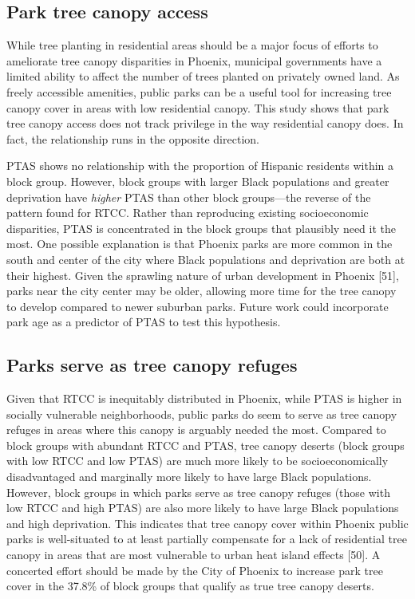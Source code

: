\documentclass[
  sn-basic,
]{sn-jnl}
\begin{document}
\subsection{Park tree canopy access}\label{sec-disc-ptas}

While tree planting in residential areas should be a major focus of
efforts to ameliorate tree canopy disparities in Phoenix, municipal
governments have a limited ability to affect the number of trees planted
on privately owned land. As freely accessible amenities, public parks
can be a useful tool for increasing tree canopy cover in areas with low
residential canopy. This study shows that park tree canopy access does
not track privilege in the way residential canopy does. In fact, the
relationship runs in the opposite direction.

PTAS shows no relationship with the proportion of Hispanic residents
within a block group. However, block groups with larger Black
populations and greater deprivation have \emph{higher} PTAS than other
block groups---the reverse of the pattern found for RTCC. Rather than
reproducing existing socioeconomic disparities, PTAS is concentrated in
the block groups that plausibly need it the most. One possible
explanation is that Phoenix parks are more common in the south and
center of the city where Black populations and deprivation are both at
their highest. Given the sprawling nature of urban development in
Phoenix {[}51{]}, parks near the city center may be older, allowing more
time for the tree canopy to develop compared to newer suburban parks.
Future work could incorporate park age as a predictor of PTAS to test
this hypothesis.

\subsection{Parks serve as tree canopy refuges}\label{sec-disc-canopy}

Given that RTCC is inequitably distributed in Phoenix, while PTAS is
higher in socially vulnerable neighborhoods, public parks do seem to
serve as tree canopy refuges in areas where this canopy is arguably
needed the most. Compared to block groups with abundant RTCC and PTAS,
tree canopy deserts (block groups with low RTCC and low PTAS) are much
more likely to be socioeconomically disadvantaged and marginally more
likely to have large Black populations. However, block groups in which
parks serve as tree canopy refuges (those with low RTCC and high PTAS)
are also more likely to have large Black populations and high
deprivation. This indicates that tree canopy cover within Phoenix public
parks is well-situated to at least partially compensate for a lack of
residential tree canopy in areas that are most vulnerable to urban heat
island effects {[}50{]}. A concerted effort should be made by the City
of Phoenix to increase park tree cover in the 37.8\% of block groups
that qualify as true tree canopy deserts.
\end{document}
